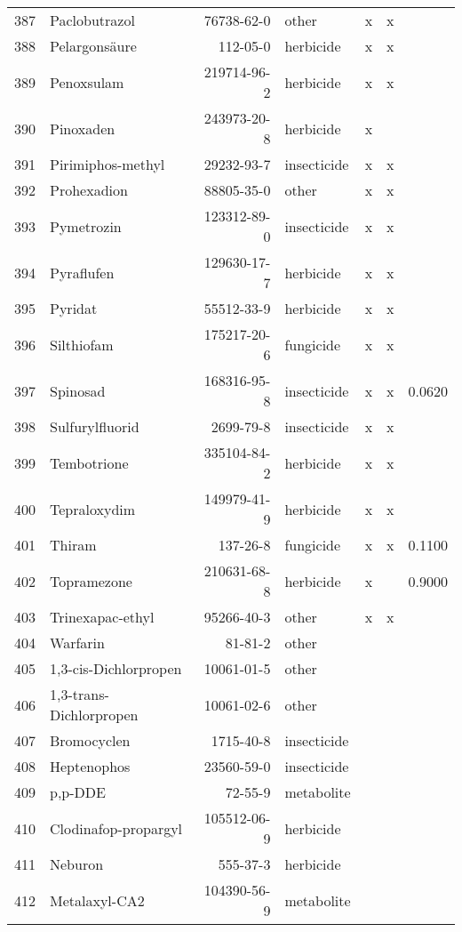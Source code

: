 \begin{longtable}{lp{3cm}rlp{0.5cm}p{0.5cm}p{1.5cm}}
  387 & Paclobutrazol & 76738-62-0 & other & x & x &  \\ 
  388 & Pelargonsäure & 112-05-0 & herbicide & x & x &  \\ 
  389 & Penoxsulam & 219714-96-2 & herbicide & x & x &  \\ 
  390 & Pinoxaden & 243973-20-8 & herbicide & x &  &  \\ 
  391 & Pirimiphos-methyl & 29232-93-7 & insecticide & x & x &  \\ 
  392 & Prohexadion & 88805-35-0 & other & x & x &  \\ 
  393 & Pymetrozin & 123312-89-0 & insecticide & x & x &  \\ 
  394 & Pyraflufen & 129630-17-7 & herbicide & x & x &  \\ 
  395 & Pyridat & 55512-33-9 & herbicide & x & x &  \\ 
  396 & Silthiofam & 175217-20-6 & fungicide & x & x &  \\ 
  397 & Spinosad & 168316-95-8 & insecticide & x & x & 0.0620 \\ 
  398 & Sulfurylfluorid & 2699-79-8 & insecticide & x & x &  \\ 
  399 & Tembotrione & 335104-84-2 & herbicide & x & x &  \\ 
  400 & Tepraloxydim & 149979-41-9 & herbicide & x & x &  \\ 
  401 & Thiram & 137-26-8 & fungicide & x & x & 0.1100 \\ 
  402 & Topramezone & 210631-68-8 & herbicide & x &  & 0.9000 \\ 
  403 & Trinexapac-ethyl & 95266-40-3 & other & x & x &  \\ 
  404 & Warfarin & 81-81-2 & other &  &  &  \\ 
  405 & 1,3-cis-Dichlorpropen & 10061-01-5 & other &  &  &  \\ 
  406 & 1,3-trans-Dichlorpropen & 10061-02-6 & other &  &  &  \\ 
  407 & Bromocyclen & 1715-40-8 & insecticide &  &  &  \\ 
  408 & Heptenophos & 23560-59-0 & insecticide &  &  &  \\ 
  409 & p,p-DDE & 72-55-9 & metabolite &  &  &  \\ 
  410 & Clodinafop-propargyl & 105512-06-9 & herbicide &  &  &  \\ 
  411 & Neburon & 555-37-3 & herbicide &  &  &  \\ 
  412 & Metalaxyl-CA2 & 104390-56-9 & metabolite &  &  &  \\ 

\end{longtable}
